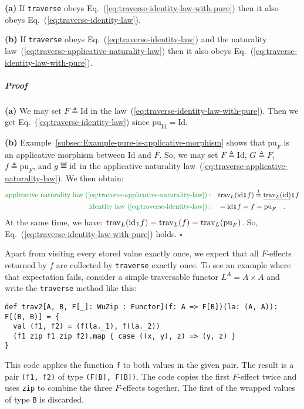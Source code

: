 \textbf{(a)} If \lstinline!traverse! obeys Eq.~(\ref{eq:traverse-identity-law-with-pure})
then it also obeys Eq.~(\ref{eq:traverse-identity-law}).

\textbf{(b)} If \lstinline!traverse! obeys Eq.~(\ref{eq:traverse-identity-law})
and the naturality law~(\ref{eq:traverse-applicative-naturality-law})
then it also obeys Eq.~(\ref{eq:traverse-identity-law-with-pure}).

\subparagraph{Proof}

\textbf{(a)} We may set $F\triangleq\text{Id}$ in the law~(\ref{eq:traverse-identity-law-with-pure}).
Then we get Eq.~(\ref{eq:traverse-identity-law}) since $\text{pu}_{\text{Id}}=\text{Id}$.

\textbf{(b)} Example~\ref{subsec:Example-pure-is-applicative-morphism}
shows that $\text{pu}_{F}$ is an applicative morphism between $\text{Id}$
and $F$. So, we may set $F\triangleq\text{Id}$, $G\triangleq F$,
$f\triangleq\text{pu}_{F}$, and $g\triangleq\text{\text{id}}$ in
the applicative naturality law~(\ref{eq:traverse-applicative-naturality-law}).
We then obtain:
\begin{align*}
{\color{greenunder}\text{applicative naturality law~(\ref{eq:traverse-applicative-naturality-law})}:}\quad & \text{trav}_{L}(\text{id}\bef f)\overset{!}{=}\gunderline{\text{trav}_{L}(\text{id})}\bef f\\
{\color{greenunder}\text{identity law~(\ref{eq:traverse-identity-law})}:}\quad & =\text{id}\bef f=f=\text{pu}_{F}\quad.
\end{align*}
At the same time, we have: $\text{trav}_{L}(\text{id}\bef f)=\text{trav}_{L}(f)=\text{trav}_{L}(\text{pu}_{F})$.
So, Eq.~(\ref{eq:traverse-identity-law-with-pure}) holds. $\square$

Apart from visiting every stored value exactly once, we expect that
all $F$-effects returned by $f$ are collected by \lstinline!traverse!
exactly once. To see an example where that expectation fails, consider
a simple traversable functor $L^{A}=A\times A$ and write the \lstinline!traverse!
method like this:
\begin{lstlisting}
def trav2[A, B, F[_]: WuZip : Functor](f: A => F[B])(la: (A, A)): F[(B, B)] = {
  val (f1, f2) = (f(la._1), f(la._2))
  (f1 zip f1 zip f2).map { case ((x, y), z) => (y, z) }
}
\end{lstlisting}
This code applies the function \lstinline!f! to both values in the
given pair. The result is a pair \lstinline!(f1, f2)! of type \lstinline!(F[B], F[B])!.
The code copies the first $F$-effect twice and uses \lstinline!zip!
to combine the three $F$-effects together. The first of the wrapped
values of type \lstinline!B! is discarded.

